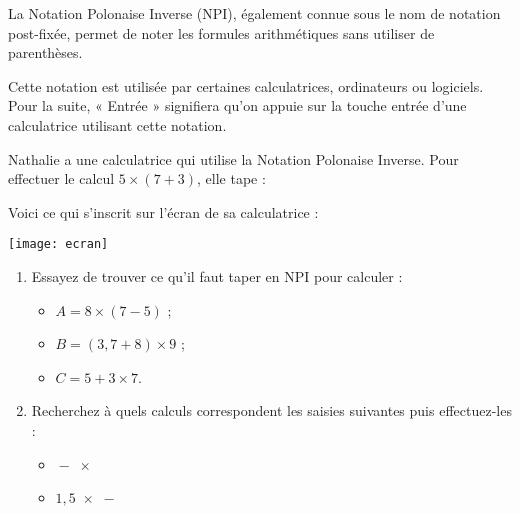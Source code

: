\begin{TP}

La Notation Polonaise Inverse (NPI), également connue sous le nom de notation post-fixée, permet de noter les formules arithmétiques sans utiliser de parenthèses.

Cette notation est utilisée par certaines calculatrices, ordinateurs ou logiciels. Pour la suite, « Entrée » signifiera qu'on appuie sur la touche entrée d'une calculatrice utilisant cette notation.


Nathalie a une calculatrice qui utilise la Notation Polonaise Inverse. Pour effectuer le calcul $5 \times (7 + 3)$, elle tape : \\[-1em]
\begin{center} \boxed{\textcolor{C2}{7}} \quad \boxed{\text{\textcolor{C2}{Entrée}}} \quad \boxed{\textcolor{H1}{3}} \quad \boxed{\text{\textcolor{H1}{Entrée}}} \quad \boxed{\textcolor{BleuOuv}{+}} \quad \boxed{\textcolor{J1}{5}} \quad \boxed{\text{\textcolor{J1}{Entrée}}} \quad \boxed{\times} \end{center}

\vspace{1em}

Voici ce qui s'inscrit sur l'écran de sa calculatrice :\\[1em]
\begin{center} \texttt{[image: ecran]} \end{center}

\begin{enumerate}
 \item Essayez de trouver ce qu'il faut taper en NPI pour calculer :
 \begin{itemize}
  \item $A = 8 \times (7 - 5)$ ;
  \item $B = (3,7 + 8) \times 9$ ;
  \item $C = 5 + 3 \times 7$.
  \end{itemize}
  
 \item Recherchez à quels calculs correspondent les saisies suivantes puis effectuez-les :
  \begin{itemize} 
  
  \vspace{1em}
  
  \item {} \quad {} \quad {} \quad {} \quad $\boxed{-}$ \quad {} \quad {} \quad $\boxed{\times}$ \\[-0.75em]
  \item {} \quad {} \quad {} \quad {} \quad $\boxed{1,5}$ \quad {} \quad $\boxed{\times}$ \quad $\boxed{-}$
  \end{itemize}
\end{enumerate}



\end{TP}
